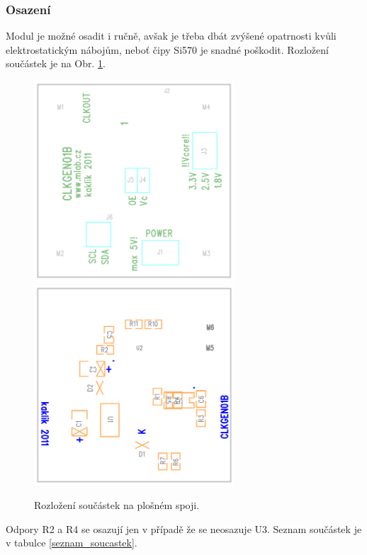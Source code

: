 \documentclass[12pt,a4paper,oneside]{article}
\begin{document}
\subsubsection{Osazení}

Modul je možné osadit i ručně, avšak je třeba dbát zvýšené opatrnosti kvůli elektrostatickým nábojům, neboť čipy Si570 je snadné poškodit. Rozložení součástek je na Obr. \ref{Osazovaky}.

\begin{figure}[htbp]
\begin{center}
\includegraphics [width=75mm] {./img/O1.png} 
\includegraphics [width=75mm] {./img/O2.png} 
\end{center}
\caption{Rozložení součástek na plošném spoji.}
\label{Osazovaky}
\end{figure}

Odpory R2 a R4 se osazují jen v případě že se neosazuje U3. Seznam součástek je v tabulce \ref{seznam_soucastek}.
\end{document}
